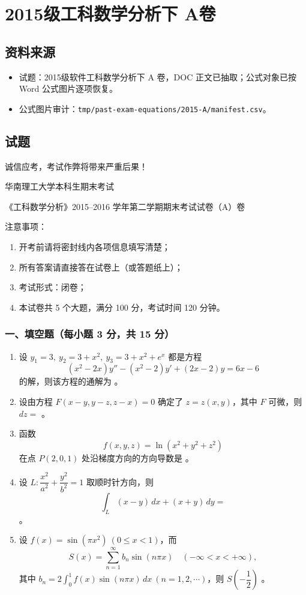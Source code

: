 \section{2015级工科数学分析下 A卷}

\subsection{资料来源}
\begin{itemize}
  \item 试题：2015级软件工科数学分析下 A 卷，DOC 正文已抽取；公式对象已按 Word 公式图片逐项恢复。
  \item 公式图片审计：\texttt{tmp/past-exam-equations/2015-A/manifest.csv}。
\end{itemize}

\subsection{试题}
诚信应考，考试作弊将带来严重后果！

华南理工大学本科生期末考试

《工科数学分析》2015--2016 学年第二学期期末考试试卷（A）卷

注意事项：
\begin{enumerate}
  \item 开考前请将密封线内各项信息填写清楚；
  \item 所有答案请直接答在试卷上（或答题纸上）；
  \item 考试形式：闭卷；
  \item 本试卷共 5 个大题，满分 100 分，考试时间 120 分钟。
\end{enumerate}

\subsubsection*{一、填空题（每小题 3 分，共 15 分）}
\begin{enumerate}
  \item 设 $y_1=3,\ y_2=3+x^2,\ y_3=3+x^2+e^x$ 都是方程
  \[
  (x^2-2x)y''-(x^2-2)y'+(2x-2)y=6x-6
  \]
  的解，则该方程的通解为 \underline{\hspace{4cm}}。
  \item 设由方程 $F(x-y,y-z,z-x)=0$ 确定了 $z=z(x,y)$，其中 $F$ 可微，则 $dz=$ \underline{\hspace{3cm}}。
  \item 函数
  \[
    f(x,y,z)=\ln(x^2+y^2+z^2)
  \]
  在点 $P(2,0,1)$ 处沿梯度方向的方向导数是 \underline{\hspace{4cm}}。
  \item 设 $L:\dfrac{x^2}{a^2}+\dfrac{y^2}{b^2}=1$ 取顺时针方向，则
  \[
  \int_L(x-y)\,dx+(x+y)\,dy=
  \]
  \underline{\hspace{3cm}}。
  \item 设 $f(x)=\sin(\pi x^2)\ (0\le x<1)$，而
  \[
  S(x)=\sum_{n=1}^{\infty}b_n\sin(n\pi x)\quad(-\infty<x<+\infty),
  \]
  其中 $b_n=2\int_0^1 f(x)\sin(n\pi x)\,dx\ (n=1,2,\cdots)$，则 $S\!\left(-\dfrac12\right)$ \underline{\hspace{3cm}}。
\end{enumerate}

